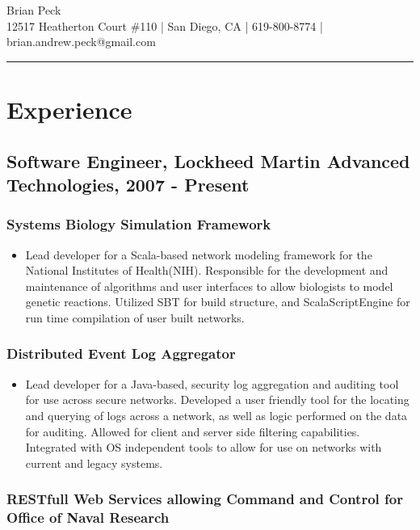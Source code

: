 \documentclass[11pt]{article}
\title{}
\date{}
\begin{document}
\begin{center}
{\huge Brian Peck} \\
12517 Heatherton Court \#110 | San Diego, CA | 619-800-8774 | brian.andrew.peck@gmail.com
\hrule
\end{center}

\section*{Experience}
\label{sec-1}

\subsection*{Software Engineer, Lockheed Martin Advanced Technologies, 2007 - Present}
\label{sec-1.1}

\subsubsection*{Systems Biology Simulation Framework}
\label{sec-1.1.1}

\begin{itemize}
\item Lead developer for a Scala-based network modeling framework for the National Institutes of Health(NIH). Responsible for the development and maintenance of algorithms and user interfaces to allow biologists to model genetic reactions. Utilized SBT for build structure, and ScalaScriptEngine for run time compilation of user built networks.
\end{itemize}
\subsubsection*{Distributed Event Log Aggregator}
\label{sec-1.1.2}

\begin{itemize}
\item Lead developer for a Java-based, security log aggregation and auditing tool for use across secure networks. Developed a user friendly tool for the locating and querying of logs across a network, as well as logic performed on the data for auditing. Allowed for client and server side filtering capabilities. Integrated with OS independent tools to allow for use on networks with current and legacy systems.
\end{itemize}
\subsubsection*{RESTfull Web Services allowing Command and Control for Office of Naval Research}
\label{sec-1.1.3}
\end{document}
